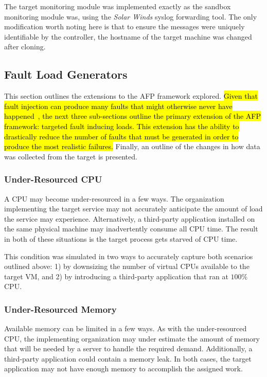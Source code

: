The target monitoring module was implemented exactly as the sandbox monitoring
module was, using the \emph{Solar Winds} syslog forwarding tool.  The only
modification worth noting here is that to ensure the messages were uniquely
identifiable by the controller, the hostname of the target machine was changed
after cloning.

\setcounter{secnumdepth}{3}

\subsection{Fault Load Generators} \label{sec:extensions}
This section outlines the extensions to the \ac{AFP} framework explored.
\hl{Given that fault injection can produce many faults that might otherwise
never have happened~\citep{kikuchi2014,natella2016assessing}, the next three
sub-sections outline the primary extension of the \ac{AFP} framework: targeted
fault inducing loads.  This extension has the ability to drastically reduce the
number of faults that must be generated in order to produce the most realistic
failures.} Finally, an outline of the changes in how data was collected from
the target is presented.

\subsubsection{Under-Resourced \ac{CPU}} \label{sec:extUnderResourcedCPU}
A \ac{CPU} may become under-resourced in a few ways.  The organization
implementing the target service may not accurately anticipate the amount of
load the service may experience.  Alternatively, a third-party application
installed on the same physical machine may inadvertently consume all \ac{CPU}
time.  The result in both of these situations is the target process gets
starved of \ac{CPU} time.

This condition was simulated in two ways to accurately capture both scenarios
outlined above:  1) by downsizing the number of virtual \ac{CPU}s available
to the target \ac{VM}, and 2) by introducing a third-party application that
ran at $100\%$ \ac{CPU}.

\subsubsection{Under-Resourced Memory} \label{sec:extUnderResourcedMem}
Available memory can be limited in a few ways.  As with the under-resourced
\ac{CPU}, the implementing organization may under estimate the amount of memory
that will be needed by a server to handle the required demand.  Additionally, a
third-party application could contain a memory leak.  In both cases, the target
application may not have enough memory to accomplish the assigned work.

